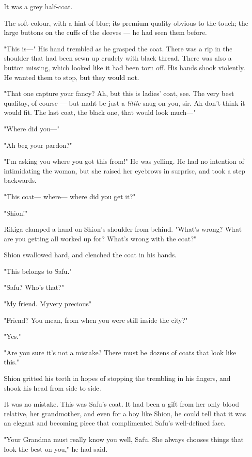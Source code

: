 It was a grey half-coat.

The soft colour, with a hint of blue; its premium quality obvious to the
touch; the large buttons on the cuffs of the sleeves --- he had seen them
before.

"This is---" His hand trembled as he grasped the coat. There was a rip in
the shoulder that had been sewn up crudely with black thread. There was
also a button missing, which looked like it had been torn off. His hands
shook violently. He wanted them to stop, but they would not.

"That one capture your fancy? Ah, but this is ladies' coat, see. The
very best qualitay, of course --- but maht be just a \emph{little} snug on you,
sir. Ah don't think it would fit. The last coat, the black one, that
would look much---"

"Where did you---"

"Ah beg your pardon?"

"I'm asking you where you got this from!" He was yelling. He had no
intention of intimidating the woman, but she raised her eyebrows in
surprise, and took a step backwards.

"This coat--- where--- where did you get it?"

"Shion!"

Rikiga clamped a hand on Shion's shoulder from behind. "What's wrong?
What are you getting all worked up for? What's wrong with the coat?"

Shion swallowed hard, and clenched the coat in his hands.

"This belongs to Safu."

"Safu? Who's that?"

"My friend. My\el very precious\el "

"Friend? You mean, from when you were still inside the city?"

"Yes."

"Are you sure it's not a mistake? There must be dozens of coats that
look like this."

Shion gritted his teeth in hopes of stopping the trembling in his
fingers, and shook his head from side to side.

It was no mistake. This was Safu's coat. It had been a gift from her
only blood relative, her grandmother, and even for a boy like Shion, he
could tell that it was an elegant and becoming piece that complimented
Safu's well-defined face.

"Your Grandma must really know you well, Safu. She always chooses things
that look the best on you," he had said.

